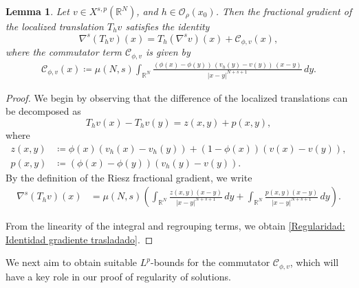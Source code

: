 \documentclass[]{amsart}
\newtheorem{Lemma}[theorem]{Lemma}
\theoremstyle{definition}
\theoremstyle{definition}
\theoremstyle{remark}
\numberwithin{equation}{section}
\newcommand{\mus}{\mu(N, s)}
\begin{document}
	
\begin{Lemma}
	\label{Regularidad: Traslación del gradiente}
	Let \( v \in X^{s,p}(\mathbb{R}^{N}) \), and \( h \in \mathcal{O}_\rho\left(x_0\right) \). Then the fractional gradient of the localized translation \( T_h v \) satisfies the identity
	\begin{equation}
		\label{Regularidad: Identidad gradiente trasladado}
		\nabla^s(T_h v)(x) = T_h(\nabla^s v)(x) + \mathcal{C}_{\phi,v}(x),
	\end{equation}
	where the commutator term \( \mathcal{C}_{\phi,v} \) is given by 
	\begin{align}
		\label{eq: Regularidad-conmutador}
	   \mathcal{C}_{\phi,v}(x) \coloneq  \mus \int_{\mathbb{R}^N} \frac{(\phi(x) - \phi(y)) \, (v_h(y) - v(y)) \, (x - y)}{|x - y|^{N + s + 1}} \, dy.
	\end{align}
\end{Lemma}
%
\begin{proof}
	We begin by observing that the difference of the localized translations can be decomposed as 
	\[ 
	T_h v(x) - T_h v(y) = z(x,y)+ p(x,y),
	\]
	where
	\begin{align*}
		z(x,y) &\coloneq \phi(x)(v_h(x) - v_h(y)) + (1 - \phi(x))(v(x) - v(y)), \\
		p(x,y) &\coloneq (\phi(x) - \phi(y))\left(v_h(y)- v(y)\right).
	\end{align*}
	By the definition of the Riesz fractional gradient, we write
	\begin{align*}
		\nabla^s(T_h v)(x) %
		&= \mus \left( \int_{\mathbb{R}^N} \frac{z(x,y)(x - y)}{|x - y|^{N + s + 1}} \, dy + \int_{\mathbb{R}^N} \frac{p(x,y)(x - y)}{|x - y|^{N + s + 1}} \, dy \right).
	\end{align*}
	
From the linearity of the integral and regrouping terms, we obtain \eqref{Regularidad: Identidad gradiente trasladado}.
\end{proof}

We next aim to 
 obtain suitable $L^p$-bounds for the commutator $\mathcal{C}_{\phi,v}$, which will have a key role in our proof of regularity of solutions.
 
\end{document}

